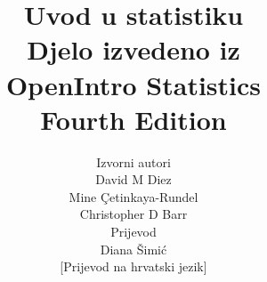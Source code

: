 

\title{\huge Uvod u statistiku \\[2mm]
\large Djelo izvedeno iz \\
OpenIntro Statistics \\
Fourth Edition}
\author{\Large Izvorni autori \\[1.5mm]
\normalsize David M Diez \\
\normalsize Mine \c{C}etinkaya-Rundel \\
\normalsize Christopher D Barr \\[8mm]
\Large Prijevod \\[1.5mm]
\normalsize Diana Šimić \\
\small [Prijevod na hrvatski jezik] \\[2mm]
}

